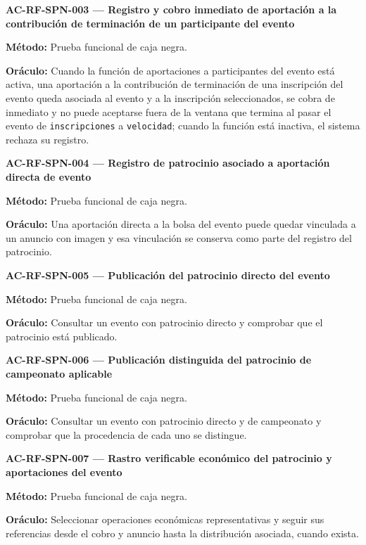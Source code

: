 \documentclass[10pt,letterpaper]{article}
\begin{document}
\noindent\textbf{AC-RF-SPN-003 --- Registro y cobro inmediato de aportación a la contribución de terminación de un participante del evento}\par
\textbf{Método:} Prueba funcional de caja negra.\par
\textbf{Oráculo:} Cuando la función de aportaciones a participantes del evento está activa, una aportación a la contribución de terminación de una inscripción del evento queda asociada al evento y a la inscripción seleccionados, se cobra de inmediato y no puede aceptarse fuera de la ventana que termina al pasar el evento de \texttt{inscripciones} a \texttt{velocidad}; cuando la función está inactiva, el sistema rechaza su registro.\par\vspace{0.45em}
\noindent\textbf{AC-RF-SPN-004 --- Registro de patrocinio asociado a aportación directa de evento}\par
\textbf{Método:} Prueba funcional de caja negra.\par
\textbf{Oráculo:} Una aportación directa a la bolsa del evento puede quedar vinculada a un anuncio con imagen y esa vinculación se conserva como parte del registro del patrocinio.\par\vspace{0.45em}
\noindent\textbf{AC-RF-SPN-005 --- Publicación del patrocinio directo del evento}\par
\textbf{Método:} Prueba funcional de caja negra.\par
\textbf{Oráculo:} Consultar un evento con patrocinio directo y comprobar que el patrocinio está publicado.\par\vspace{0.45em}
\noindent\textbf{AC-RF-SPN-006 --- Publicación distinguida del patrocinio de campeonato aplicable}\par
\textbf{Método:} Prueba funcional de caja negra.\par
\textbf{Oráculo:} Consultar un evento con patrocinio directo y de campeonato y comprobar que la procedencia de cada uno se distingue.\par\vspace{0.45em}
\noindent\textbf{AC-RF-SPN-007 --- Rastro verificable económico del patrocinio y aportaciones del evento}\par
\textbf{Método:} Prueba funcional de caja negra.\par
\textbf{Oráculo:} Seleccionar operaciones económicas representativas y seguir sus referencias desde el cobro y anuncio hasta la distribución asociada, cuando exista.\par\vspace{0.45em}
\end{document}
